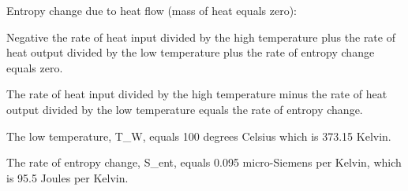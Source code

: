 Entropy change due to heat flow (mass of heat equals zero):

Negative the rate of heat input divided by the high temperature plus the rate of heat output divided by the low temperature plus the rate of entropy change equals zero.

The rate of heat input divided by the high temperature minus the rate of heat output divided by the low temperature equals the rate of entropy change.

The low temperature, T_W, equals 100 degrees Celsius which is 373.15 Kelvin.

The rate of entropy change, S_ent, equals 0.095 micro-Siemens per Kelvin, which is 95.5 Joules per Kelvin.